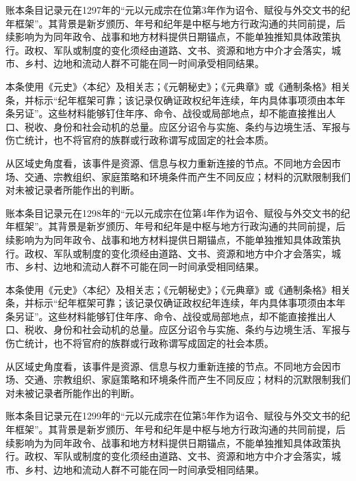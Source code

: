 账本条目记录元在1297年的“元以元成宗在位第3年作为诏令、赋役与外交文书的纪年框架”。其背景是新岁颁历、年号和纪年是中枢与地方行政沟通的共同前提，后续影响为为同年政令、战事和地方材料提供日期锚点，不能单独推知具体政策执行。政权、军队或制度的变化须经由道路、文书、资源和地方中介才会落实，城市、乡村、边地和流动人群不可能在同一时间承受相同结果。

本条使用《元史》〈本纪〉及相关志；《元朝秘史》；《元典章》或《通制条格》相关条，并标示“纪年框架可靠；该记录仅确证政权纪年连续，年内具体事项须由本年条另证”。这些材料能够钉住年序、命令、战役或局部地点，却不能直接推出人口、税收、身份和社会动机的总量。应区分诏令与实施、条约与边境生活、军报与伤亡统计，也不将官府的族群或行政称谓写成固定的社会本质。

从区域史角度看，该事件是资源、信息与权力重新连接的节点。不同地方会因市场、交通、宗教组织、家庭策略和环境条件而产生不同反应；材料的沉默限制我们对未被记录者所能作出的判断。

账本条目记录元在1298年的“元以元成宗在位第4年作为诏令、赋役与外交文书的纪年框架”。其背景是新岁颁历、年号和纪年是中枢与地方行政沟通的共同前提，后续影响为为同年政令、战事和地方材料提供日期锚点，不能单独推知具体政策执行。政权、军队或制度的变化须经由道路、文书、资源和地方中介才会落实，城市、乡村、边地和流动人群不可能在同一时间承受相同结果。

本条使用《元史》〈本纪〉及相关志；《元朝秘史》；《元典章》或《通制条格》相关条，并标示“纪年框架可靠；该记录仅确证政权纪年连续，年内具体事项须由本年条另证”。这些材料能够钉住年序、命令、战役或局部地点，却不能直接推出人口、税收、身份和社会动机的总量。应区分诏令与实施、条约与边境生活、军报与伤亡统计，也不将官府的族群或行政称谓写成固定的社会本质。

从区域史角度看，该事件是资源、信息与权力重新连接的节点。不同地方会因市场、交通、宗教组织、家庭策略和环境条件而产生不同反应；材料的沉默限制我们对未被记录者所能作出的判断。

账本条目记录元在1299年的“元以元成宗在位第5年作为诏令、赋役与外交文书的纪年框架”。其背景是新岁颁历、年号和纪年是中枢与地方行政沟通的共同前提，后续影响为为同年政令、战事和地方材料提供日期锚点，不能单独推知具体政策执行。政权、军队或制度的变化须经由道路、文书、资源和地方中介才会落实，城市、乡村、边地和流动人群不可能在同一时间承受相同结果。

